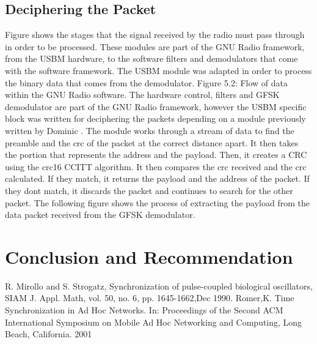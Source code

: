 \documentclass[a4paper,10pt]{article}
\begin{document}
\subsection{Deciphering the Packet}
Figure shows the stages that the signal received by the radio must
pass through in order to be processed. These modules are part of the
GNU Radio framework, from the USBM hardware, to the software filters
and demodulators that come with the software framework. The USBM
module was adapted in order to process the binary data that comes
from the demodulator. Figure 5.2: Flow of data within the GNU Radio
software. The hardware control, filters and GFSK demodulator are
part of the GNU Radio framework, however the USBM specific block was
written for deciphering the packets depending on a module previously
written by Dominic . The module works through a stream of data to
find the preamble and the crc of the packet at the correct distance
apart. It then takes the portion that represents the address and the
payload. Then, it creates a CRC using the crc16 CCITT algorithm. It
then compares the crc received and the crc calculated. If they
match, it returns the payload and the address of the packet. If they
dont match, it discards the packet and continues to search for the
other packet. The following figure shows the process of extracting
the payload from the data packet received from the GFSK demodulator.
\section{Conclusion and Recommendation}
\newpage
\begin{thebibliography}{}
 R. Mirollo and S. Strogatz, Synchronization of pulse-coupled biological oscillators, SIAM J. Appl. Math, vol. 50, no. 6, pp. 1645-1662,Dec 1990.
 Romer,K. Time Synchronization in Ad Hoc Networks. In: Proceedings of the Second ACM International Symposium on Mobile Ad Hoc Networking and Computing, Long Beach, California. 2001
\end{thebibliography}
\end{document}

